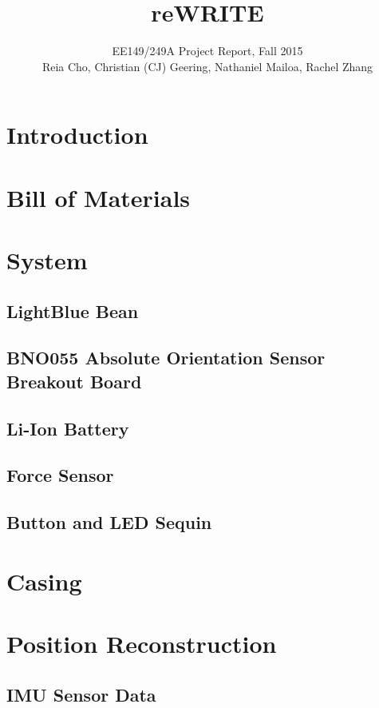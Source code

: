 \documentclass[12pt,journal]{IEEEtran}
\begin{document}
\title{reWRITE}

\author{EE149/249A Project Report, Fall 2015

Reia Cho, Christian (CJ) Geering, Nathaniel Mailoa, Rachel Zhang}



\maketitle

\section{Introduction}


\section{Bill of Materials}


\section{System}
\subsection{LightBlue Bean}
\subsection{BNO055 Absolute Orientation Sensor Breakout Board}
\subsection{Li-Ion Battery}
\subsection{Force Sensor}
\subsection{Button and LED Sequin}

\section{Casing}

\section{Position Reconstruction}
\subsection{IMU Sensor Data}
\end{document}
